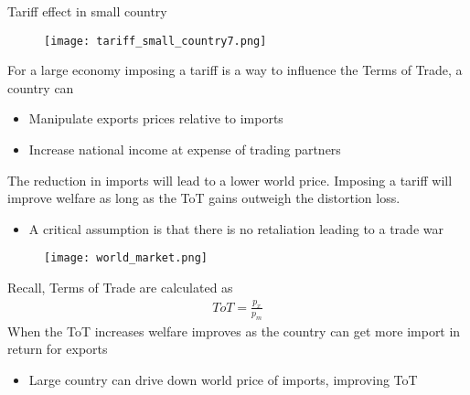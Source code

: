 \documentclass{beamer}
\begin{document}
\begin{frame}{Tariff effect in small country}
  \begin{figure}
    \texttt{[image: tariff\_small\_country7.png]}
  \end{figure}
\end{frame}

\begin{frame}
  For a large economy imposing a tariff is a way to influence the Terms of Trade, a country can
  \begin{itemize}
    \item Manipulate exports prices relative to imports
    \item Increase national income at expense of trading partners
  \end{itemize}
  \medskip
  The reduction in imports will lead to a lower world price.
  Imposing a tariff will improve welfare as long as the ToT gains outweigh the distortion loss.
  \begin{itemize}
    \item A critical assumption is that there is no retaliation leading to a trade war
  \end{itemize}
\end{frame}

\begin{frame}
  \begin{figure}
    \texttt{[image: world\_market.png]}
  \end{figure}
\end{frame}

\begin{frame}
 Recall, Terms of Trade are calculated as 
 \begin{align*}
   ToT = \frac{p_x}{p_m}
 \end{align*}
 \medskip
 When the ToT increases welfare improves as the country can get more import in return for exports
 \begin{itemize}
   \item Large country can drive down world price of imports, improving ToT
 \end{itemize}
\end{frame}
\end{document}
